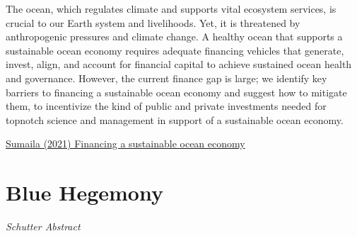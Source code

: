 \documentclass[
]{book}
\begin{document}
The ocean, which regulates climate and supports vital ecosystem services, is crucial to our Earth system and livelihoods. Yet, it is threatened by anthropogenic pressures and climate change. A healthy ocean that supports a sustainable ocean economy requires adequate financing vehicles that generate, invest, align, and account for financial capital to achieve sustained ocean health and governance. However, the current finance gap is large; we identify key barriers to financing a sustainable ocean economy and suggest how to mitigate them, to incentivize the kind of public and private investments needed for topnotch science and management in support of a sustainable ocean economy.

\href{https://www.nature.com/articles/s41467-021-23168-y}{Sumaila (2021) Financing a sustainable ocean economy}

\hypertarget{blue-hegemony}{%
\section{Blue Hegemony}\label{blue-hegemony}}

\emph{Schutter Abstract}
\end{document}
